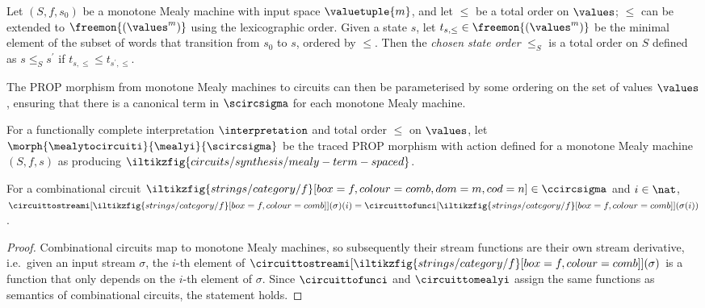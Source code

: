 \begin{definition}
    Let \((S, f, s_0)\) be a monotone Mealy machine with input space
    \(\valuetuple{m}\), and let \(\leq\) be a total order on \(\values\);
    \(\leq\) can be extended to \(\freemon{(\values^m)}\) using the
    lexicographic order.
    Given a state \(s\), let \(t_{s,\leq} \in \freemon{(\values^m)}\) be
    the minimal element of the subset of words that transition from \(s_0\) to
    \(s\), ordered by \(\leq\).
    Then the \emph{chosen state order} \(\leq_S\) is a total order on \(S\)
    defined as \(s \leq_S s^\prime\) if \(t_{s,\leq} \leq t_{s^\prime,\leq}\).
\end{definition}

The PROP morphism from monotone Mealy machines to circuits can then be
parameterised by some ordering on the set of values \(\values\), ensuring that
there is a canonical term in \(\scircsigma\) for each monotone Mealy machine.

\begin{definition}\label{def:mealy-to-circuit}
    For a functionally complete interpretation \(\interpretation\) and total
    order \(\leq\) on \(\values\), let \(
    \morph{
        \mealytocircuiti
    }{
        \mealyi
    }{
        \scircsigma
    }
    \) be the traced PROP morphism with action defined for a monotone Mealy
    machine \((S,f,s)\) as producing \(
    \iltikzfig{circuits/synthesis/mealy-term-spaced}
    \).
\end{definition}

\begin{lemma}\label{lem:combinational-streams}
    For a combinational circuit \(
    \iltikzfig{strings/category/f}[box=f,colour=comb,dom=m,cod=n]
    \in \ccircsigma
    \) and \(i \in \nat\), \(
    \circuittostreami[
        \iltikzfig{strings/category/f}[box=f,colour=comb]
    ](\sigma)(i)
    =
    \circuittofunci[
        \iltikzfig{strings/category/f}[box=f,colour=comb]
    ](\sigma(i))
    \).
\end{lemma}
\begin{proof}
    Combinational circuits map to monotone Mealy machines, so subsequently
    their stream functions are their own stream derivative, i.e.\ given an
    input stream \(\sigma\), the \(i\)-th element of \(
    \circuittostreami[
        \iltikzfig{strings/category/f}[box=f,colour=comb]
    ](\sigma)
    \) is a function that only depends on the \(i\)-th element of \(\sigma\).
    Since \(\circuittofunci\) and \(\circuittomealyi\) assign the same functions
    as semantics of combinational circuits, the statement holds.
\end{proof}

